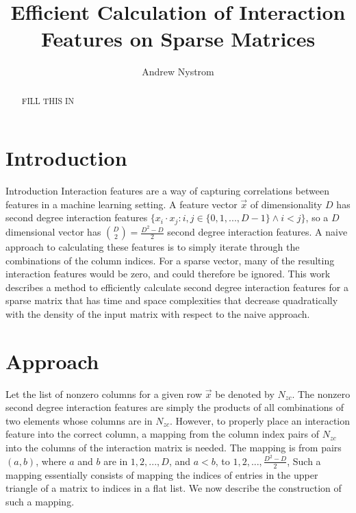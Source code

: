 \documentclass[11pt]{article}
\begin{document}
\title{Efficient Calculation of Interaction Features on Sparse Matrices}
\author{Andrew Nystrom}
\date{}

\maketitle

\begin{abstract}%
FILL THIS IN
\end{abstract}

\section{Introduction}

Introduction
Interaction features are a way of capturing correlations between features in a machine 
learning setting. A feature vector $\vec{x}$ of dimensionality $D$ has second degree interaction features 
$\{x_i \cdot x_j : i, j \in \{0,1,..., D-1\} \land i < j\}$, 
so a $D$ dimensional vector has $\binom{D}{2} = \frac{D^2-D}{2}$ second degree interaction features. A naive
approach to calculating these features is to simply iterate through the combinations of the column indices.
For a sparse vector, many of the resulting interaction features would be zero, and could therefore be ignored.
This work describes a method to efficiently calculate second degree interaction features for a sparse matrix 
that has time and space complexities that decrease quadratically with the density of the input matrix with respect to the naive approach.

\section{Approach}
Let the list of nonzero columns for a given row $\vec{x}$ be denoted by $N_{zc}$. The nonzero second degree 
interaction features are simply the products of all combinations of two elements whose 
columns are in $N_{zc}$. However, to properly place an interaction feature into the correct column, a mapping from the column 
index pairs of $N_{zc}$ into the columns of the interaction matrix is needed. The mapping is 
from pairs $(a, b)$,  where $a$ and $b$ are in $1,2,..., D$, and $a < b$, to $1,2,..., \frac{D^2-D}{2}$,  Such a mapping essentially consists of mapping the indices of entries in the upper triangle of a matrix to indices in a flat 
list. We now describe the construction of such a mapping. 
\end{document}
